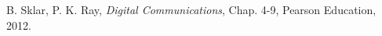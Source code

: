 \documentclass[a4paper,portrait,10pt]{article}   %
\begin{document}

\begin{thebibliography}{99} %

 B. Sklar, P. K. Ray, \textit{Digital Communications}, Chap. 4-9, Pearson Education, 2012.
 
\end{thebibliography}







\end{document}
